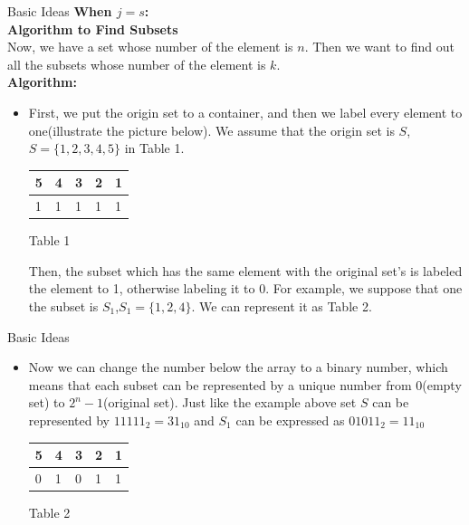 \documentclass[hyperref={pdfpagelabels=false}]{beamer}
\begin{document}
\begin{frame}{Basic Ideas}
\textbf{When $j=s$:}\\
\textbf{Algorithm to Find Subsets}\\
Now, we have a set whose number of the element is $n$. Then we want to find out all the subsets whose number of the element is $k$.\\
\textbf{Algorithm: }
        \begin{itemize}
            \item First, we put the origin set to a container, and then we label every element to one(illustrate the picture below). 
            We assume that the origin set is $S$, $S=\{1,2,3,4,5\}$ in Table 1.
            \begin{center}
            \begin{table}[!hpbt]
                \centering
                \begin{tabular}{lllll}
                \hline
                \multicolumn{1}{|l|}{5} & \multicolumn{1}{l|}{4} & \multicolumn{1}{l|}{3} & \multicolumn{1}{l|}{2} & \multicolumn{1}{l|}{1} \\ \hline
                1& 1& 1& 1& 1                     
                \end{tabular}
            \end{table}
            Table 1
            \end{center}
            Then, the subset which has the same element with the original set's is labeled the element to 1, otherwise labeling it to 0. For 
            example, we suppose that one the subset is $S_1$,$S_1=\{1,2,4\}$. We can represent it as Table 2.
        \end{itemize} 
\end{frame}

\begin{frame}{Basic Ideas}
    \begin{itemize}
        \item  Now we can change the number below the array to a binary number, which means that each subset can be represented by a unique number from 
        0(empty set) to $2^n-1$(original set). Just like the example above set $S$ can be represented by $11111_2 = 31_{10}$ and $S_1$ can be expressed as $01011_2 = 11_{10}$
        \begin{center}
        \begin{table}[!hpbt]
                \centering
                \begin{tabular}{lllll}
                \hline
                \multicolumn{1}{|l|}{5} & \multicolumn{1}{l|}{4} & \multicolumn{1}{l|}{3} & \multicolumn{1}{l|}{2} & \multicolumn{1}{l|}{1}\\ \hline
                0& 1& 0& 1& 1                     
                \end{tabular}
            \end{table}
            Table 2
        \end{center}
    \end{itemize}
\end{frame}
\end{document}
